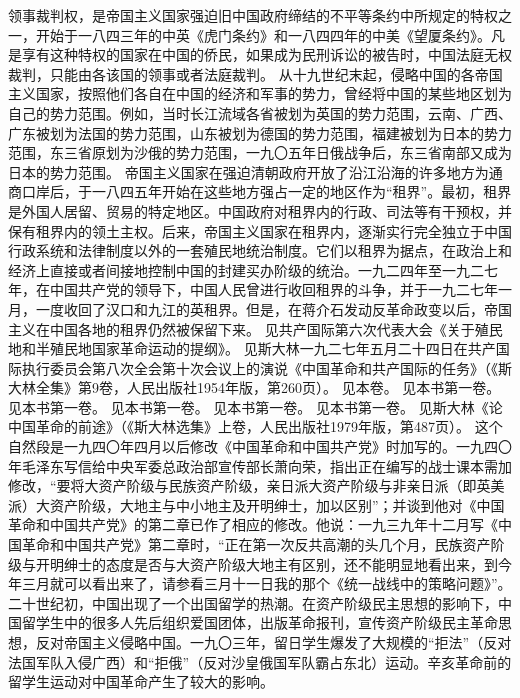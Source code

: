\begin{maonote}
领事裁判权，是帝国主义国家强迫旧中国政府缔结的不平等条约中所规定的特权之一，开始于一八四三年的中英《虎门条约》和一八四四年的中美《望厦条约》。凡是享有这种特权的国家在中国的侨民，如果成为民刑诉讼的被告时，中国法庭无权裁判，只能由各该国的领事或者法庭裁判。
从十九世纪末起，侵略中国的各帝国主义国家，按照他们各自在中国的经济和军事的势力，曾经将中国的某些地区划为自己的势力范围。例如，当时长江流域各省被划为英国的势力范围，云南、广西、广东被划为法国的势力范围，山东被划为德国的势力范围，福建被划为日本的势力范围，东三省原划为沙俄的势力范围，一九〇五年日俄战争后，东三省南部又成为日本的势力范围。
帝国主义国家在强迫清朝政府开放了沿江沿海的许多地方为通商口岸后，于一八四五年开始在这些地方强占一定的地区作为“租界”。最初，租界是外国人居留、贸易的特定地区。中国政府对租界内的行政、司法等有干预权，并保有租界内的领土主权。后来，帝国主义国家在租界内，逐渐实行完全独立于中国行政系统和法律制度以外的一套殖民地统治制度。它们以租界为据点，在政治上和经济上直接或者间接地控制中国的封建买办阶级的统治。一九二四年至一九二七年，在中国共产党的领导下，中国人民曾进行收回租界的斗争，并于一九二七年一月，一度收回了汉口和九江的英租界。但是，在蒋介石发动反革命政变以后，帝国主义在中国各地的租界仍然被保留下来。
见共产国际第六次代表大会《关于殖民地和半殖民地国家革命运动的提纲》。
见斯大林一九二七年五月二十四日在共产国际执行委员会第八次全会第十次会议上的演说《中国革命和共产国际的任务》（《斯大林全集》第9卷，人民出版社1954年版，第260页）。
见本卷。
见本书第一卷。
见本书第一卷。
见本书第一卷。
见本书第一卷。
见本书第一卷。
见斯大林《论中国革命的前途》（《斯大林选集》上卷，人民出版社1979年版，第487页）。
这个自然段是一九四〇年四月以后修改《中国革命和中国共产党》时加写的。一九四〇年毛泽东写信给中央军委总政治部宣传部长萧向荣，指出正在编写的战士课本需加修改，“要将大资产阶级与民族资产阶级，亲日派大资产阶级与非亲日派（即英美派）大资产阶级，大地主与中小地主及开明绅士，加以区别”；并谈到他对《中国革命和中国共产党》的第二章已作了相应的修改。他说：一九三九年十二月写《中国革命和中国共产党》第二章时，“正在第一次反共高潮的头几个月，民族资产阶级与开明绅士的态度是否与大资产阶级大地主有区别，还不能明显地看出来，到今年三月就可以看出来了，请参看三月十一日我的那个《统一战线中的策略问题》”。
二十世纪初，中国出现了一个出国留学的热潮。在资产阶级民主思想的影响下，中国留学生中的很多人先后组织爱国团体，出版革命报刊，宣传资产阶级民主革命思想，反对帝国主义侵略中国。一九〇三年，留日学生爆发了大规模的“拒法”（反对法国军队入侵广西）和“拒俄”（反对沙皇俄国军队霸占东北）运动。辛亥革命前的留学生运动对中国革命产生了较大的影响。
\end{maonote}
